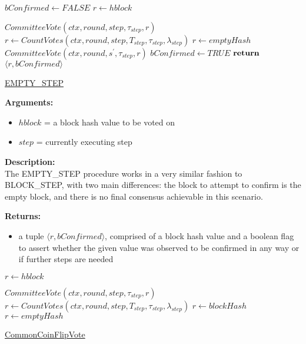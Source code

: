 \documentclass[10pt,a4paper]{article}
\begin{document}
\begin{algorithm}
    \begin{algorithmic}[H]
        \State $bConfirmed \gets FALSE$
        \State $r \gets hblock$

    \State $CommitteeVote(ctx, round, step, \tau_{step}, r)$
    \State $r \gets CountVotes(ctx,round,step,T_{step},\tau_{step},\lambda_{step})$
        \State $r \gets emptyHash$
            \State $CommitteeVote(ctx, round, s^\prime, \tau_{step}, r)$
        \EndFor
        \State $bConfirmed \gets TRUE$
    \EndIf
    $\Return$ $\langle r, bConfirmed \rangle$
    \EndFunction
    \end{algorithmic}
    \caption{\underline{EMPTY\_STEP}}
\end{algorithm}

\noindent \textbf{Arguments:}
\begin{itemize}
    \item $hblock$ = a block hash value to be voted on
    \item $step$ = currently executing step
  \end{itemize}

\noindent \textbf{Description:}\\
The EMPTY\_STEP procedure works in a very similar fashion to BLOCK\_STEP, with two main differences: 
the block to attempt to confirm is the empty block, and there is no final consensus achievable in this scenario.

\noindent \textbf{Returns:}
\begin{itemize}
    \item a tuple $\langle r, bConfirmed \rangle$, comprised of a block hash value and a boolean flag to assert whether the given value was
    observed to be confirmed in any way or if further steps are needed
  \end{itemize}

\begin{algorithm}
    \begin{algorithmic}[H]
        \State $r \gets hblock$
    
        \State $CommitteeVote(ctx, round, step, \tau_{step}, r)$
        \State $r \gets CountVotes(ctx,round,step,T_{step},\tau_{step},\lambda_{step})$
                \State $r \gets blockHash$
            \Else
                \State $r \gets emptyHash$
            \EndIf
        \EndIf
    \EndFunction
    \end{algorithmic}
    \caption{\underline{CommonCoinFlipVote}}
\end{algorithm}
\end{document}
